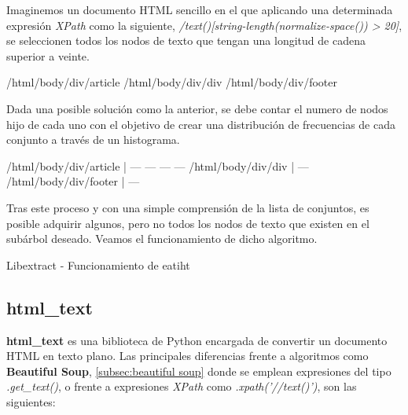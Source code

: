 Imaginemos un documento HTML sencillo en el que aplicando una determinada expresión \emph{XPath} como la 
siguiente, \emph{/text()[string-length(normalize-space()) > 20]}, se seleccionen todos los nodos de texto 
que tengan una longitud de cadena superior a veinte.

\begin{Schunk}
  \begin{Soutput}
    /html/body/div/article
    /html/body/div/div
    /html/body/div/footer
  \end{Soutput}
\end{Schunk}

Dada una posible solución como la anterior, se debe contar el numero de nodos hijo de cada uno con el 
objetivo de crear una distribución de frecuencias de cada conjunto a través de un histograma.

\begin{Schunk}
  \begin{Soutput}
    /html/body/div/article   | — — — —
    /html/body/div/div       | —
    /html/body/div/footer    | —
  \end{Soutput}
\end{Schunk}

Tras este proceso y con una simple comprensión de la lista de conjuntos, es posible adquirir algunos, pero 
no todos los nodos de texto que existen en el subárbol deseado. Veamos el funcionamiento de dicho algoritmo.

\begin{codefloat}
  
  \caption{Libextract - Funcionamiento de eatiht}
  \label{cod:libextract - funcionamiento de eatiht}
\end{codefloat}

\subsection{html\_text}
\label{subsec:html_text}

\textbf{html\_text} \cite{html-text} es una biblioteca de Python encargada de convertir un documento HTML
en texto plano. Las principales diferencias frente a algoritmos como \textbf{Beautiful Soup},
\ref{subsec:beautiful soup} donde se emplean expresiones del tipo \emph{.get\_text()}, o frente a expresiones
\emph{XPath} como \emph{.xpath('//text()')}, son las siguientes:

